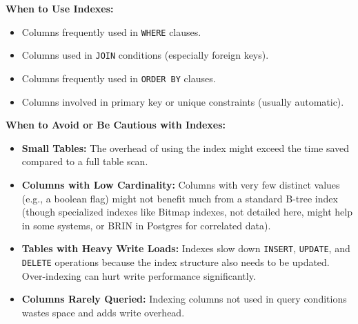 \documentclass[12pt]{book}
\begin{document}
\textbf{When to Use Indexes:}
\begin{itemize}
    \item Columns frequently used in \texttt{WHERE} clauses.
    \item Columns used in \texttt{JOIN} conditions (especially foreign keys).
    \item Columns frequently used in \texttt{ORDER BY} clauses.
    \item Columns involved in primary key or unique constraints (usually automatic).
\end{itemize}

\textbf{When to Avoid or Be Cautious with Indexes:}
\begin{itemize}
    \item \textbf{Small Tables:} The overhead of using the index might exceed the time saved compared to a full table scan.
    \item \textbf{Columns with Low Cardinality:} Columns with very few distinct values (e.g., a boolean flag) might not benefit much from a standard B-tree index (though specialized indexes like Bitmap indexes, not detailed here, might help in some systems, or BRIN in Postgres for correlated data).
    \item \textbf{Tables with Heavy Write Loads:} Indexes slow down \texttt{INSERT}, \texttt{UPDATE}, and \texttt{DELETE} operations because the index structure also needs to be updated. Over-indexing can hurt write performance significantly.
    \item \textbf{Columns Rarely Queried:} Indexing columns not used in query conditions wastes space and adds write overhead.
\end{itemize}
\end{document}
